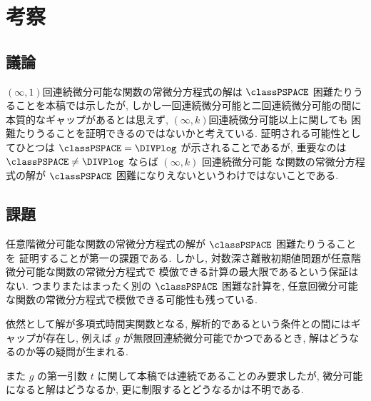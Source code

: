 \section{考察}


\subsection{議論}
$(\infty, 1)$回連続微分可能な関数の常微分方程式の解は $\classPSPACE$ 困難たりうることを本稿では示したが,
しかし一回連続微分可能と二回連続微分可能の間に本質的なギャップがあるとは思えず,
$(\infty, k)$回連続微分可能以上に関しても \classPSPACE 困難たりうることを証明できるのではないかと考えている.
証明される可能性としてひとつは $\classPSPACE = \DIVPlog$ が示されることであるが,
重要なのは $\classPSPACE \not = \DIVPlog$ ならば $(\infty, k)$ 回連続微分可能
な関数の常微分方程式の解が $\classPSPACE$ 困難になりえないというわけではないことである.


\subsection{課題}

任意階微分可能な関数の常微分方程式の解が $\classPSPACE$ 困難たりうることを
証明することが第一の課題である.
しかし, 対数深さ離散初期値問題が任意階微分可能な関数の常微分方程式で
模倣できる計算の最大限であるという保証はない.
つまりまたはまったく別の $\classPSPACE$ 困難な計算を,
任意回微分可能な関数の常微分方程式で模倣できる可能性も残っている.

依然として解が多項式時間実関数となる, 解析的であるという条件との間にはギャップが存在し,
例えば $g$ が無限回連続微分可能でかつであるとき, 解はどうなるのか等の疑問が生まれる.

また $g$ の第一引数 $t$ に関して本稿では連続であることのみ要求したが,
微分可能になると解はどうなるか, 更に制限するとどうなるかは不明である.



